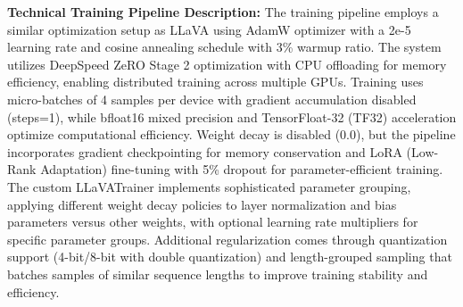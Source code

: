 \textbf{Technical Training Pipeline Description:} The training pipeline employs a similar optimization setup as LLaVA \citep{liu2023visual} using AdamW optimizer with a 2e-5 learning rate and cosine annealing schedule with 3\% warmup ratio. The system utilizes DeepSpeed ZeRO Stage 2 optimization with CPU offloading for memory efficiency, enabling distributed training across multiple GPUs. Training uses micro-batches of 4 samples per device with gradient accumulation disabled (steps=1), while bfloat16 mixed precision and TensorFloat-32 (TF32) acceleration optimize computational efficiency. Weight decay is disabled (0.0), but the pipeline incorporates gradient checkpointing for memory conservation and LoRA (Low-Rank Adaptation) fine-tuning with 5\% dropout for parameter-efficient training. The custom LLaVATrainer implements sophisticated parameter grouping, applying different weight decay policies to layer normalization and bias parameters versus other weights, with optional learning rate multipliers for specific parameter groups. Additional regularization comes through quantization support (4-bit/8-bit with double quantization) and length-grouped sampling that batches samples of similar sequence lengths to improve training stability and efficiency.





